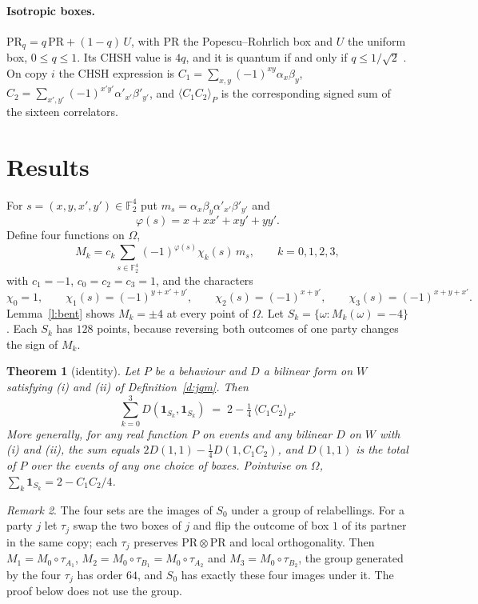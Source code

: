 \documentclass[11pt,a4paper]{article}
\newtheorem{theorem}{Theorem}
\theoremstyle{definition}
\theoremstyle{remark}
\newtheorem{remark}[theorem]{Remark}
\newcommand{\PR}{\mathrm{PR}}
\newcommand{\ind}[1]{\mathbf{1}_{#1}}
\newcommand{\ev}[1]{\langle #1\rangle_P}
\newcommand{\F}{\mathbb{F}_2}
\begin{document}
\paragraph{Isotropic boxes.} $\PR_q=q\,\PR+(1-q)\,U$, with $\PR$ the Popescu--Rohrlich box \cite{PR}
and $U$ the uniform box, $0\le q\le1$. Its CHSH value is $4q$, and it is quantum if and only if
$q\le 1/\sqrt2$ \cite{Tsirelson}. On copy $i$ the CHSH expression is
$C_1=\sum_{x,y}(-1)^{xy}\alpha_x\beta_y$, $C_2=\sum_{x',y'}(-1)^{x'y'}\alpha'_{x'}\beta'_{y'}$, and
$\ev{C_1C_2}$ is the corresponding signed sum of the sixteen correlators.

\section{Results}

For $s=(x,y,x',y')\in\F^4$ put $m_s=\alpha_x\beta_y\alpha'_{x'}\beta'_{y'}$ and
\[
\varphi(s)=x+xx'+xy'+yy' .
\]
Define four functions on $\Omega$,
\[
M_k=c_k\sum_{s\in\F^4}(-1)^{\varphi(s)}\chi_k(s)\,m_s,\qquad k=0,1,2,3,
\]
with $c_1=-1$, $c_0=c_2=c_3=1$, and the characters
\[
\chi_0=1,\qquad \chi_1(s)=(-1)^{y+x'+y'},\qquad \chi_2(s)=(-1)^{x+y'},\qquad \chi_3(s)=(-1)^{x+y+x'} .
\]
Lemma~\ref{l:bent} shows $M_k=\pm4$ at every point of $\Omega$. Let $S_k=\{\omega: M_k(\omega)=-4\}$.
Each $S_k$ has $128$ points, because reversing both outcomes of one party changes the sign of $M_k$.

\begin{theorem}[identity]\label{t:identity}
Let $P$ be a behaviour and $D$ a bilinear form on $W$ satisfying (i) and (ii) of
Definition~\ref{d:jqm}. Then
\[
\sum_{k=0}^{3}D(\ind{S_k},\ind{S_k})\;=\;2-\tfrac14\,\ev{C_1C_2}.
\]
More generally, for any real function $P$ on events and any bilinear $D$ on $W$ with (i) and (ii), the
sum equals $2D(1,1)-\frac14 D(1,C_1C_2)$, and $D(1,1)$ is the total of $P$ over the events of any one
choice of boxes. Pointwise on $\Omega$, $\sum_k\ind{S_k}=2-C_1C_2/4$.
\end{theorem}

\begin{remark}
The four sets are the images of $S_0$ under a group of relabellings. For a party $j$ let $\tau_j$ swap
the two boxes of $j$ and flip the outcome of box $1$ of its partner in the same copy; each $\tau_j$
preserves $\PR\otimes\PR$ and local orthogonality. Then $M_1=M_0\circ\tau_{A_1}$,
$M_2=M_0\circ\tau_{B_1}=M_0\circ\tau_{A_2}$ and $M_3=M_0\circ\tau_{B_2}$, the group generated by the
four $\tau_j$ has order $64$, and $S_0$ has exactly these four images under it. The proof below does not
use the group.
\end{remark}
\end{document}
